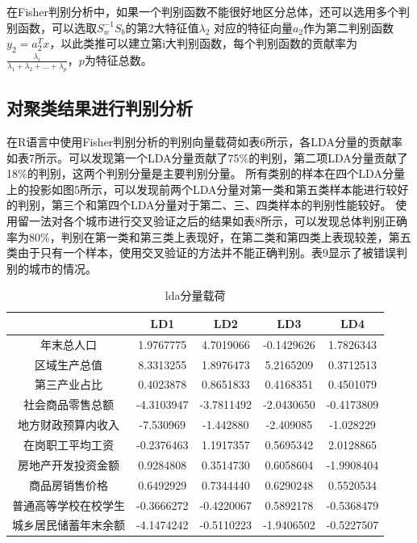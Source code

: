 \documentclass [a4paper]{article}
\begin{document}
在Fisher判别分析中，如果一个判别函数不能很好地区分总体，还可以选用多个判别函数，可以选取$S_w^{-1}S_b$的第2大特征值$\lambda_2$ 对应的特征向量$a_2$作为第二判别函数 $y_2 = a_2^Tx$，以此类推可以建立第i大判别函数，每个判别函数的贡献率为$\frac{\lambda_i}{\lambda_1 + \lambda_2 + ... + \lambda_p}$，$p$为特征总数。

\subsection{对聚类结果进行判别分析}
在R语言中使用Fisher判别分析的判别向量载荷如表6所示，各LDA分量的贡献率如表7所示。可以发现第一个LDA分量贡献了75\%的判别，第二项LDA分量贡献了18\%的判别，这两个判别分量是主要判别分量。
所有类别的样本在四个LDA分量上的投影如图5所示，可以发现前两个LDA分量对第一类和第五类样本能进行较好的判别，第三个和第四个LDA分量对于第二、三、四类样本的判别性能较好。
使用留一法对各个城市进行交叉验证之后的结果如表8所示，可以发现总体判别正确率为80\%，判别在第一类和第三类上表现好，在第二类和第四类上表现较差，第五类由于只有一个样本，使用交叉验证的方法并不能正确判别。表9显示了被错误判别的城市的情况。

\begin{table}[h]
  \centering
  \caption{lda分量载荷}
  \small %
  \begin{tabular}{ccccc}
  \toprule
 &LD1 &	LD2	 &LD3	 &LD4\\
  \midrule

年末总人口	 &1.9767775 &		4.7019066 &		-0.1429626 &		1.7826343\\
区域生产总值	 &	8.3313255 &		1.8976473	 &	5.2165209	 &	0.3712513\\
第三产业占比 &		0.4023878 &		0.8651833	 &	0.4168351	 &	0.4501079\\
社会商品零售总额 &		-4.3103947 &		-3.7811492 &	-2.0430650 &		-0.4173809\\
地方财政预算内收入 &		-7.530969	 &	-1.442880	 &	-2.409085	 &	-1.028229\\
在岗职工平均工资 &		-0.2376463 &		1.1917357 &		0.5695342 &		2.0128865\\
房地产开发投资金额 &		0.9284808	 &	0.3514730	 &	0.6058604 &		-1.9908404\\
商品房销售价格 &		0.6492929	 &	0.7344440 &		0.6290248 &		0.5520534\\
普通高等学校在校学生 &		-0.3666272 &		-0.4220067	 &	0.5892178	 &	-0.5368479\\
城乡居民储蓄年末余额 &		-4.1474242 &		-0.5110223 &		-1.9406502 &		-0.5227507\\

  \bottomrule
  \end{tabular}
\end{table}
\end{document}
